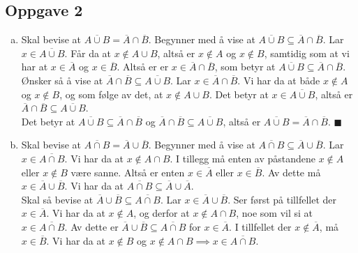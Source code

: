 \documentclass{article}
\begin{document}
\subsection*{Oppgave 2}
\begin{enumerate}[(a)]
    \item {
        Skal bevise at $\overline{A \cup B} = \overline{A} \cap \overline{B}$. 
        Begynner med å vise at $\overline{A \cup B} \subseteq \overline{A} \cap \overline{B}$. Lar $x \in \overline{A \cup B}$. Får da at $x \notin A \cup B$, altså er $x \notin A$ og $x \notin B$,
        samtidig som at vi har at $x \in \overline{A}$ og $x \in \overline{B}$. Altså er er $x \in \overline{A} \cap \overline{B}$, som betyr at 
        $\overline{A \cup B} \subseteq \overline{A} \cap \overline{B}$. \\
        Ønsker så å vise at $\overline{A} \cap \overline{B} \subseteq \overline{A \cup B}$. Lar $x \in \overline{A} \cap \overline{B}$. Vi har da at både
        $x \notin A$ og $x \notin B$, og som følge av det, at $x \notin A \cup B$. Det betyr at 
        $x \in \overline{A \cup B}$, altså er $\overline{A} \cap \overline{B} \subseteq \overline{A \cup B}$. \\
        Det betyr at $\overline{A \cup B} \subseteq \overline{A} \cap \overline{B}$ og $\overline{A} \cap \overline{B} \subseteq \overline{A \cup B}$, altså er 
        $\overline{A \cup B} = \overline{A} \cap \overline{B}$. $\blacksquare$
    }
    \item {
        Skal bevise at $\overline{A \cap B} = \overline{A} \cup \overline{B}$.
        Begynner med å vise at $\overline{A \cap B} \subseteq \overline{A} \cup \overline{B}$. Lar $x \in \overline{A \cap B}$.
        Vi har da at $x \notin A \cap B$. I tillegg må enten av påstandene $x \notin A$ eller $x \notin B$ være sanne.
        Altså er enten $x \in \overline{A}$ eller $x \in \overline{B}$. Av dette må $x \in \overline{A} \cup \overline{B}$. Vi har da at 
        $\overline{A \cap B} \subseteq \overline{A} \cup \overline{A}$. \\
        Skal så bevise at $\overline{A} \cup \overline{B} \subseteq \overline{A \cap B}$. Lar $x \in \overline{A} \cup \overline{B}$.
        Ser først på tillfellet der $x \in \overline{A}$. Vi har da at $x \notin A$, og derfor at $x \notin A \cap B$, noe som vil si at 
        $x \in \overline{A \cap B}$. Av dette er $\overline{A} \cup \overline{B} \subseteq \overline{A \cap B}$ for $x \in \overline{A}$.
        I tillfellet der $x \notin \overline{A}$, må $x \in \overline{B}$. Vi har da at $x \notin B$ og $x \notin A \cap B \implies x \in \overline{A \cap B}$. \\
}
\end{enumerate}
\end{document}

